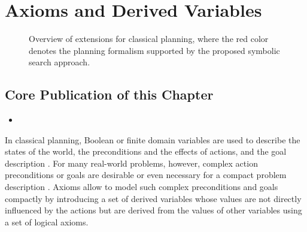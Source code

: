 \chapter{Axioms and Derived Variables}\label{ch:axioms}

\renewcommand{\kiviatPredicates}{2}
\begin{figure}[t]
    \begin{center}
        
    \end{center}
    \caption[Overview of extension for classical planning (axioms).]{Overview of extensions for classical planning, where the red color denotes the planning formalism supported by the proposed symbolic search approach.}\label{fig:dervided_predicates:kiviat}
\end{figure}
\renewcommand{\kiviatPredicates}{1}

\section*{Core Publication of this Chapter}
\renewcommand{\citebf}[1]{\textbf{#1}}
\begin{itemize}
    \item {}
\end{itemize}
\renewcommand{\citebf}[1]{#1}

In classical planning, Boolean or finite domain variables are used to describe the states of the world, the preconditions and the effects of actions, and the goal description \autocite{fikes-nilsson-aij1971,backstrom-nebel-compint1995}.
For many real-world problems, however, complex action preconditions or goals are desirable or even necessary for a compact problem description \autocite{thiebaux-et-al-aij2005}.
Axioms allow to model such complex preconditions and goals compactly by introducing a set of derived variables whose values are not directly influenced by the actions but are derived from the values of other variables using a set of logical axioms.

